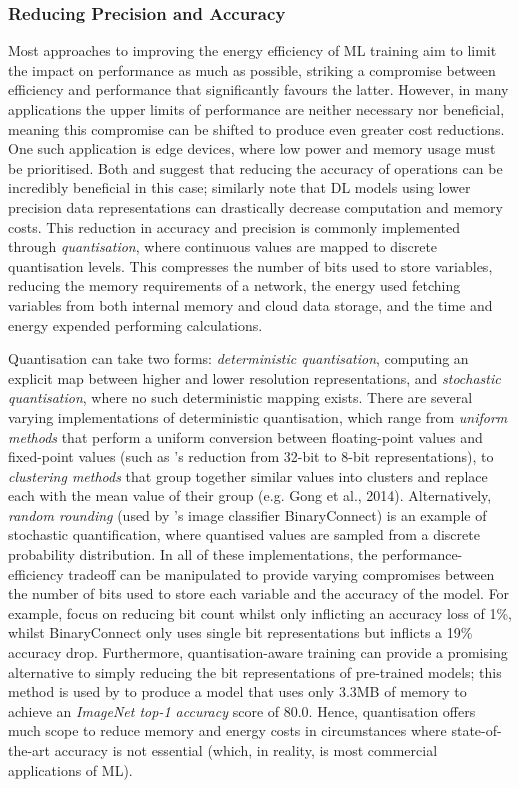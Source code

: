 \documentclass[a4paper, 12pt]{article}
\begin{document}
    \subsubsection{Reducing Precision and Accuracy}

    Most approaches to improving the energy efficiency of ML training aim to limit the impact on performance as much as possible, striking a compromise between efficiency and performance that significantly favours the latter. However, in many applications the upper limits of performance are neither necessary nor beneficial, meaning this compromise can be shifted to produce even greater cost reductions. One such application is edge devices, where low power and memory usage must be prioritised. Both  and  suggest that reducing the accuracy of operations can be incredibly beneficial in this case;  similarly note that DL models using lower precision data representations can drastically decrease computation and memory costs. This reduction in accuracy and precision is commonly implemented through \emph{quantisation}, where continuous values are mapped to discrete quantisation levels. This compresses the number of bits used to store variables, reducing the memory requirements of a network, the energy used fetching variables from both internal memory and cloud data storage, and the time and energy expended performing calculations. 

    Quantisation can take two forms: \emph{deterministic quantisation}, computing an explicit map between higher and lower resolution representations, and \emph{stochastic quantisation}, where no such deterministic mapping exists. There are several varying implementations of deterministic quantisation, which range from \emph{uniform methods} that perform a uniform conversion between floating-point values and fixed-point values (such as 's reduction from 32-bit to 8-bit representations), to \emph{clustering methods} that group together similar values into clusters and replace each with the mean value of their group (e.g. Gong et al., 2014). Alternatively, \emph{random rounding} (used by 's image classifier BinaryConnect) is an example of stochastic quantification, where quantised values are sampled from a discrete probability distribution. In all of these implementations, the performance-efficiency tradeoff can be manipulated to provide varying compromises between the number of bits used to store each variable and the accuracy of the model. For example,  focus on reducing bit count whilst only inflicting an accuracy loss of 1\%, whilst BinaryConnect only uses single bit representations but inflicts a 19\% accuracy drop. Furthermore, quantisation-aware training can provide a promising alternative to simply reducing the bit representations of pre-trained models; this method is used by  to produce a model that uses only 3.3MB of memory to achieve an \emph{ImageNet top-1 accuracy} score of 80.0. Hence, quantisation offers much scope to reduce memory and energy costs in circumstances where state-of-the-art accuracy is not essential (which, in reality, is most commercial applications of ML).
\end{document}

